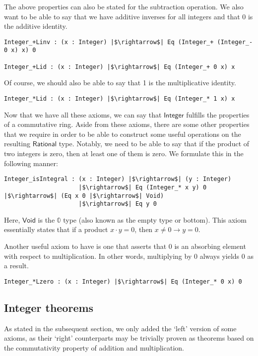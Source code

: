 \documentclass[12pt,twoside,maitrise]{dms}
\theoremstyle{definition}
\numberwithin{equation}{section}
\numberwithin{table}{chapter}
\numberwithin{figure}{chapter}
\newcommand\kw[1] {\textsf{#1}}
\begin{document}
The above properties can also be stated for the subtraction operation. We also want to be able to say that we have additive inverses for all integers and that 0 is the additive identity.

\begin{verbatim}
Integer_+Linv : (x : Integer) |$\rightarrow$| Eq (Integer_+ (Integer_- 0 x) x) 0

Integer_+Lid : (x : Integer) |$\rightarrow$| Eq (Integer_+ 0 x) x
\end{verbatim}

Of course, we should also be able to say that 1 is the multiplicative identity.

\begin{verbatim}
Integer_*Lid : (x : Integer) |$\rightarrow$| Eq (Integer_* 1 x) x
\end{verbatim}

Now that we have all these axioms, we can say that $\kw{Integer}$ fulfills the properties of a commutative ring. Aside from these axioms, there are some other properties that we require in order to be able to construct some useful operations on the resulting $\kw{Rational}$ type. Notably, we need to be able to say that if the product of two integers is zero, then at least one of them is zero. We formulate this in the following manner:

\begin{verbatim}
Integer_isIntegral : (x : Integer) |$\rightarrow$| (y : Integer)
                     |$\rightarrow$| Eq (Integer_* x y) 0 |$\rightarrow$| (Eq x 0 |$\rightarrow$| Void)
                     |$\rightarrow$| Eq y 0
\end{verbatim}

Here, $\kw{Void}$ is the $\mathbb{0}$ type (also known as the empty type or bottom). This axiom essentially states that if a product $x \cdot y = 0$, then $x \ne 0 \rightarrow y = 0$.

Another useful axiom to have is one that asserts that 0 is an absorbing element with respect to multiplication. In other words, multiplying by 0 always yields 0 as a result.

\begin{verbatim}
Integer_*Lzero : (x : Integer) |$\rightarrow$| Eq (Integer_* 0 x) 0
\end{verbatim}

\subsection*{Integer theorems}\label{subsection:int-theorems}
As stated in the subsequent section, we only added the `left' version of some
axioms, as their `right' counterparts may be trivially proven as theorems based
on the commutativity property of addition and multiplication.
\end{document}
